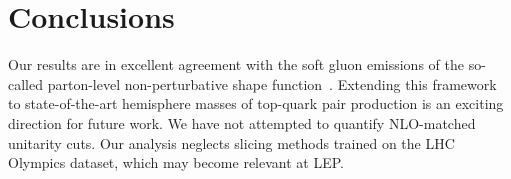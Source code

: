 \section{Conclusions}\label{sec:conclusions}

Our results are in excellent agreement with the soft gluon emissions of
the so-called parton-level non-perturbative shape
function~\cite{TPC:0270-Harnessing-Interpretable-by-Design-Effective-Theories-for-Jet-Substructure-September-21-2026}.
Extending this framework to state-of-the-art hemisphere masses of
top-quark pair production is an exciting direction for future work. We
have not attempted to quantify NLO-matched unitarity cuts. Our analysis
neglects slicing methods trained on the LHC Olympics dataset, which may
become relevant at LEP.

